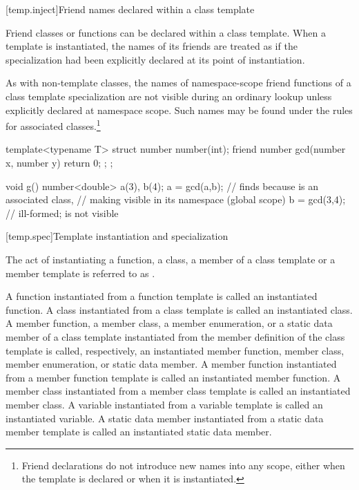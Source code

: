 [temp.inject]{Friend names declared within a class template}

\pnum
Friend classes or functions can be declared within a class template.
When a template is instantiated, the names of its friends are treated
as if the specialization had been explicitly declared at its point of
instantiation.

\pnum
As with non-template classes, the names of namespace-scope friend
functions of a class template specialization are not visible during
an ordinary lookup unless explicitly declared at namespace scope.
Such names may be found under the rules for associated
classes.\footnote{Friend declarations do not
introduce new names into any scope, either
when the template is declared or when it is instantiated.}
\begin{example}
\begin{codeblock}
template<typename T> struct number {
  number(int);
  friend number gcd(number x, number y) { return 0; };
};

void g() {
  number<double> a(3), b(4);
  a = gcd(a,b);     // finds  because  is an associated class,
                    // making  visible in its namespace (global scope)
  b = gcd(3,4);     // ill-formed;  is not visible
}
\end{codeblock}
\end{example}

[temp.spec]{Template instantiation and specialization}

\pnum
{}%
The act of instantiating a function, a class, a member of a class template or
a member template is referred to as
.

\pnum
A function instantiated from a function template is called an instantiated
function.
A class instantiated from a class template is called an instantiated class.
A member function, a member class, a member enumeration, or a static data member of a class template
instantiated from the member definition of the class template is called,
respectively, an instantiated member function, member class, member enumeration, or static data
member.
A member function instantiated from a member function template is called an
instantiated member function.
A member class instantiated from a member class template is called an
instantiated member class.
A variable instantiated from a variable template is called an
instantiated variable.
A static data member instantiated from a static data member template
is called an instantiated static data member.

